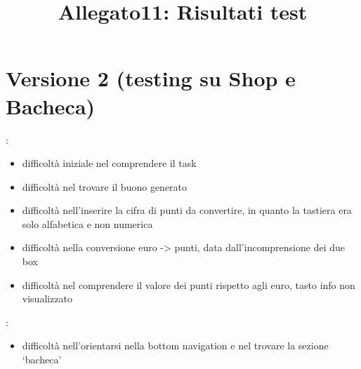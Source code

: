 \documentclass{article}
\title{\textbf{Allegato11: Risultati test}}
\date{}
\begin{document}
\maketitle

\section{Versione 2 (testing su Shop e Bacheca)}
\begin{description}
\addtolength{\itemindent}{0.5cm}
\item [Shop] :
\begin{itemize}
\item difficoltà iniziale nel comprendere il task
\item difficoltà nel trovare il buono generato
\item difficoltà nell’inserire la cifra di punti da convertire, in quanto la tastiera era solo alfabetica e non numerica
\item difficoltà nella conversione euro -> punti, data dall’incomprensione dei due box
\item difficoltà nel comprendere il valore dei punti rispetto agli euro, tasto info non visualizzato
\end{itemize}

\item [Bacheca] :
\begin{itemize}
\item difficoltà nell’orientarsi nella bottom navigation e nel trovare la sezione ‘bacheca’
\end{itemize}
\end{description}
\end{document}
